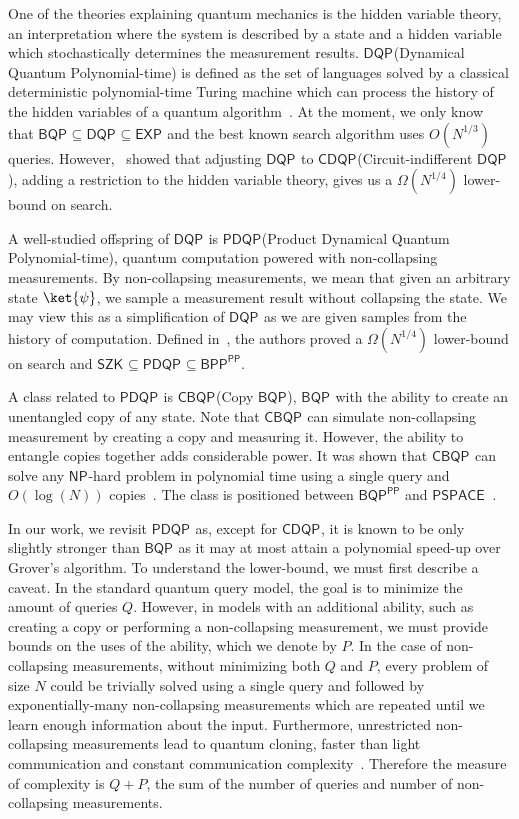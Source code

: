 \documentclass[10pt,a4paper]{article}
\newcommand{\queryamount}[0]{\ensuremath{Q}\xspace}
\newcommand{\abilityamount}[0]{\ensuremath{P}\xspace} %
\newcommand{\compclass}[2][]{\ensuremath{\mathsf{#2}^{#1}}\xspace}
\newcommand{\pdqpname}[0]{\compclass{PDQP}}
\newcommand{\bqpname}[0]{\compclass{BQP}}
\newcommand{\dqpname}[0]{\compclass{DQP}}
\newcommand{\copybqpname}[0]{\compclass{CBQP}}
\begin{document}
One of the theories explaining quantum mechanics is the hidden variable theory, an interpretation where the system is described by a state and a hidden variable which stochastically determines the measurement results. \dqpname (Dynamical Quantum Polynomial-time) is defined as the set of languages solved by a classical deterministic polynomial-time Turing machine which can process the history of the hidden variables of a quantum algorithm~\cite{dqp}. At the moment, we only know that $\bqpname\subseteq\dqpname\subseteq\compclass{EXP}$ and the best known search algorithm uses $O(N^{1/3})$ queries. However,~\cite{space_above_bqp} showed that adjusting \dqpname to \compclass{CDQP}(Circuit-indifferent \dqpname), adding a restriction to the hidden variable theory, gives us a $\Omega(N^{1/4})$ lower-bound on search.

A well-studied offspring of \dqpname is \pdqpname (Product Dynamical Quantum Polynomial-time), quantum computation powered with non-collapsing measurements. By non-collapsing measurements, we mean that given an arbitrary state $\ket{\psi}$, we sample a measurement result without collapsing the state.
We may view this as a simplification of \dqpname as we are given samples from the history of computation. Defined in~\cite{space_above_bqp}, the authors proved a $\Omega(N^{1/4})$ lower-bound on search and $\compclass{SZK}\subseteq\pdqpname\subseteq\compclass[\mathsf{PP}]{BPP}$.

A class related to \pdqpname is \copybqpname (Copy \bqpname), \bqpname with the ability to create an unentangled copy of any state. Note that \copybqpname can simulate non-collapsing measurement by creating a copy and measuring it. However, the ability to entangle copies together adds considerable power. It was shown that \copybqpname can solve any \compclass{NP}-hard problem in polynomial time using a single query and $O(\log (N))$ copies~\cite{grover_search_no_signaling_principle}. The class is positioned between  \compclass[\mathsf{PP}]{BQP} and \compclass{PSPACE}~\cite{rewindable_bqp}.

In our work, we revisit \pdqpname as, except for \compclass{CDQP}, it is known to be only slightly stronger than \bqpname as it may at most attain a polynomial speed-up over Grover's algorithm. To understand the lower-bound, we must first describe a caveat. In the standard quantum query model, the goal is to minimize the amount of queries \queryamount. However, in models with an additional ability, such as creating a copy or performing a non-collapsing measurement, we must provide bounds on the uses of the ability, which we denote by \abilityamount. In the case of non-collapsing measurements, without minimizing both \queryamount and \abilityamount, every problem of size $N$ could be trivially solved using a single query and followed by exponentially-many non-collapsing measurements which are repeated until we learn enough information about the input. Furthermore, unrestricted non-collapsing measurements lead to quantum cloning, faster than light communication and constant communication complexity~\cite{space_above_bqp}. Therefore the measure of complexity is $\queryamount + \abilityamount$, the sum of the number of queries and number of non-collapsing measurements.
\end{document}
